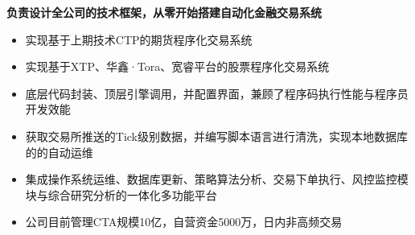 \documentclass[10pt,a4paper]{altacv}
\begin{document}

\begin{fullwidth}
\makecvheader
\end{fullwidth}



\textbf{负责设计全公司的技术框架，从零开始搭建自动化金融交易系统}
\vspace{0.15cm}

\begin{itemize}
    \item 实现基于上期技术CTP的期货程序化交易系统
    \item 实现基于XTP、华鑫·Tora、宽睿平台的股票程序化交易系统
    \item 底层代码封装、顶层引擎调用，并配置界面，兼顾了程序码执行性能与程序员开发效能
    \item 获取交易所推送的Tick级别数据，并编写脚本语言进行清洗，实现本地数据库的的自动运维
    \item 集成操作系统运维、数据库更新、策略算法分析、交易下单执行、风控监控模块与综合研究分析的一体化多功能平台
    \item 公司目前管理CTA规模10亿，自营资金5000万，日内非高频交易
\end{itemize}
\end{document}
